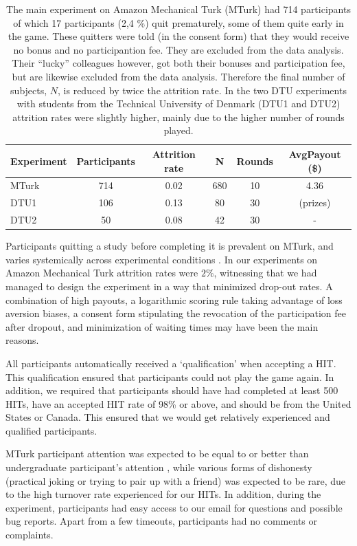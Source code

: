 \documentclass[a4paper,superscriptaddress,nofootinbib]{revtex4}
\begin{document}
\begin{table} %
\centering
\begin{tabular}{lccccc}
\hline
Experiment   &   Participants &   Attrition rate &   N & Rounds & AvgPayout  (\$) \\
\hline
 MTurk 	& 714 &  0.02 &  680 & 10 & 4.36    \\
 DTU1  	& 106 &  0.13 &  80 & 30 & (prizes)   \\
 DTU2  	&   50 &  0.08 &  42 & 30 & - \\
\hline
\end{tabular}
\caption{The main experiment on Amazon Mechanical Turk (MTurk) had 714 participants of which 17 participants (2,4 \%) quit prematurely, some of them quite early in the game. These quitters were told (in the consent form) that they would receive no bonus and no participantion fee. They are excluded from the data analysis. Their ``lucky'' colleagues however, got both their bonuses and participation fee, but are likewise excluded from the data analysis. Therefore the final number of subjects, $N$, is reduced by twice the attrition rate. In the two DTU experiments with students from the Technical University of Denmark (DTU1 and DTU2) attrition rates were slightly higher, mainly due to the higher number of rounds played.}
\label{table:A1}
\end{table}

Participants quitting a study before completing it is prevalent on MTurk, and varies systemically across experimental conditions \cite{ZhouFishbach16}. In our experiments on Amazon Mechanical Turk attrition rates were $2\%$, witnessing that we had managed to design the experiment in a way that minimized drop-out rates. A combination of high payouts, a logarithmic scoring rule taking advantage of loss aversion biases, a consent form stipulating the revocation of the participation fee after dropout, and minimization of waiting times may have been the main reasons.

All participants automatically received a `qualification' when accepting a HIT. This qualification ensured that participants could not play the game again. In addition, we required that participants should have had completed at least 500 HITs, have an accepted HIT rate of 98\% or above, and should be from the United States or Canada. This ensured that we would get relatively experienced and qualified participants.

MTurk participant attention was expected to be equal to or better than undergraduate participant’s attention \cite{Rand2012}, while various forms of dishonesty (practical joking or trying to pair up with a friend) was expected to be rare, due to the high turnover rate experienced for our HITs. In addition, during the experiment, participants had easy access to our email for questions and possible bug reports. Apart from a few timeouts, participants had no comments or complaints.
\end{document}
